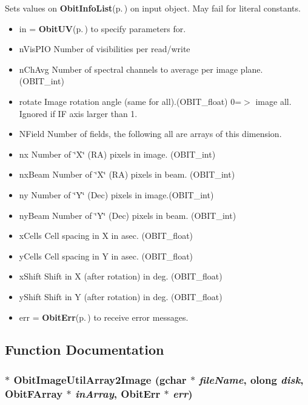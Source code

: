 Sets values on {\bf Obit\-Info\-List}{\rm (p.\,\pageref{structObitInfoList})} on input object. May fail for literal constants. \begin{itemize}
\item in = {\bf Obit\-UV}{\rm (p.\,\pageref{structObitUV})} to specify parameters for. \item n\-Vis\-PIO Number of visibilities per read/write \item n\-Ch\-Avg Number of spectral channels to average per image plane. (OBIT\_\-int) \item rotate Image rotation angle (same for all).(OBIT\_\-float) 0=$>$ image all. Ignored if IF axis larger than 1. \item NField Number of fields, the following all are arrays of this dimension. \item nx Number of \char`\"{}X\char`\"{} (RA) pixels in image. (OBIT\_\-int) \item nx\-Beam Number of \char`\"{}X\char`\"{} (RA) pixels in beam. (OBIT\_\-int) \item ny Number of \char`\"{}Y\char`\"{} (Dec) pixels in image.(OBIT\_\-int) \item ny\-Beam Number of \char`\"{}Y\char`\"{} (Dec) pixels in beam. (OBIT\_\-int) \item x\-Cells Cell spacing in X in asec. (OBIT\_\-float) \item y\-Cells Cell spacing in Y in asec. (OBIT\_\-float) \item x\-Shift Shift in X (after rotation) in deg. (OBIT\_\-float) \item y\-Shift Shift in Y (after rotation) in deg. (OBIT\_\-float) \item err = {\bf Obit\-Err}{\rm (p.\,\pageref{structObitErr})} to receive error messages. \end{itemize}


\subsection{Function Documentation}
\subsubsection{$\ast$ Obit\-Image\-Util\-Array2Image (gchar $\ast$ {\em file\-Name}, {\bf olong} {\em disk}, {\bf Obit\-FArray} $\ast$ {\em in\-Array}, {\bf Obit\-Err} $\ast$ {\em err})}\label{ObitImageUtil_8h_a13}


